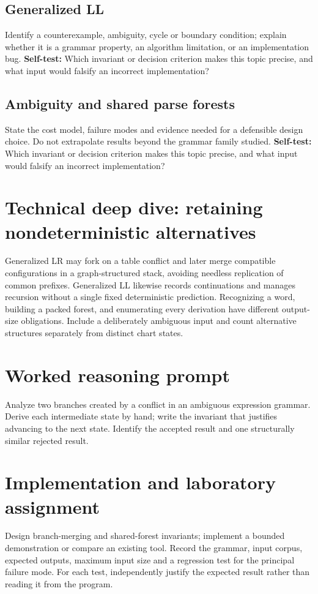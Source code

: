 \documentclass[11pt,letterpaper]{article}
\begin{document}
\subsection{Generalized LL}
Identify a counterexample, ambiguity, cycle or boundary condition; explain whether it is a grammar property, an algorithm limitation, or an implementation bug.
\textbf{Self-test:} Which invariant or decision criterion makes this topic precise, and what input would falsify an incorrect implementation?
\subsection{Ambiguity and shared parse forests}
State the cost model, failure modes and evidence needed for a defensible design choice. Do not extrapolate results beyond the grammar family studied.
\textbf{Self-test:} Which invariant or decision criterion makes this topic precise, and what input would falsify an incorrect implementation?
\section{Technical deep dive: retaining nondeterministic alternatives}
Generalized LR may fork on a table conflict and later merge compatible configurations in a graph-structured stack, avoiding needless replication of common prefixes. Generalized LL likewise records continuations and manages recursion without a single fixed deterministic prediction. Recognizing a word, building a packed forest, and enumerating every derivation have different output-size obligations. Include a deliberately ambiguous input and count alternative structures separately from distinct chart states.
\section{Worked reasoning prompt}
Analyze two branches created by a conflict in an ambiguous expression grammar. Derive each intermediate state by hand; write the invariant that justifies advancing to the next state. Identify the accepted result and one structurally similar rejected result.
\section{Implementation and laboratory assignment}
Design branch-merging and shared-forest invariants; implement a bounded demonstration or compare an existing tool. Record the grammar, input corpus, expected outputs, maximum input size and a regression test for the principal failure mode. For each test, independently justify the expected result rather than reading it from the program.
\end{document}
